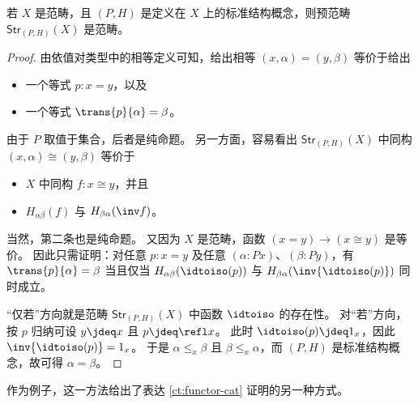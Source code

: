 \begin{thm}[结构同一性原理]\label{thm:sip}
  若 $X$ 是范畴，且 $(P,H)$ 是定义在 $X$ 上的标准结构概念，则预范畴 $\mathsf{Str}_{(P,H)}(X)$ 是范畴。
\end{thm}
\begin{proof}
  由依值对类型中的相等定义可知，给出相等 $(x,\alpha)=(y,\beta)$ 等价于给出
  \begin{itemize}
  \item 一个等式 $p:x=y$，以及
  \item 一个等式 $\trans{p}{\alpha}=\beta$。
  \end{itemize}
  由于 $P$ 取值于集合，后者是纯命题。
  另一方面，容易看出 $\mathsf{Str}_{(P,H)}(X)$ 中同构 $(x,\alpha)\cong (y,\beta)$ 等价于
  \begin{itemize}
  \item $X$ 中同构 $f:x\cong y$，并且
  \item $H_{\alpha\beta}(f)$ 与 $H_{\beta\alpha}(\inv f)$。
  \end{itemize}
  当然，第二条也是纯命题。
  又因为 $X$ 是范畴，函数 $(x=y) \to (x\cong y)$ 是等价。
  因此只需证明：对任意 $p:x=y$ 及任意 $(\alpha:Px)$、$(\beta:Py)$，有
  $\trans{p}{\alpha}=\beta$ 当且仅当 $H_{\alpha\beta}(\idtoiso (p))$ 与 $H_{\beta\alpha}(\inv{\idtoiso(p)})$ 同时成立。

  “仅若”方向就是范畴 $\mathsf{Str}_{(P,H)}(X)$ 中函数 $\idtoiso$ 的存在性。
  对“若”方向，按 $p$ 归纳可设 $y\jdeq x$ 且 $p\jdeq\refl x$。
  此时 $\idtoiso (p)\jdeq 1_x$，因此 $\inv{\idtoiso(p)}=1_x$。
  于是 $\alpha\leq_x \beta$ 且 $\beta\leq_x \alpha$，而 $(P,H)$ 是标准结构概念，故可得 $\alpha=\beta$。
\end{proof}

作为例子，这一方法给出了表达 \cref{ct:functor-cat} 证明的另一种方式。

